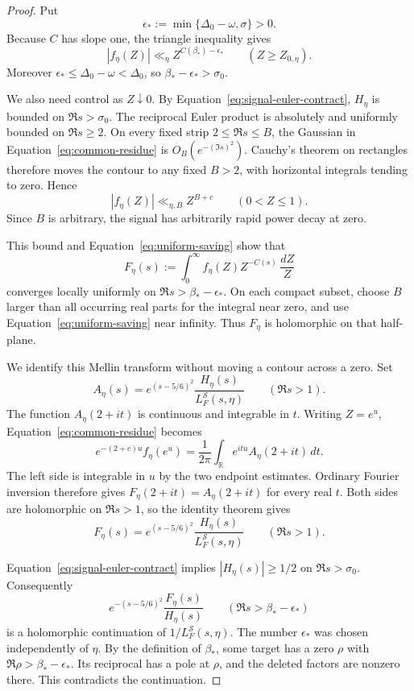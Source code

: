 \documentclass[11pt,a4paper]{article}
\numberwithin{equation}{section}
\numberwithin{figure}{section}
\theoremstyle{definition}
\theoremstyle{remark}
\begin{document}
\begin{proof}
Put
\[
 \epsilon_*:=\min\{\Delta_0-\omega,\sigma\}>0.
\]
Because $C$ has slope one, the triangle inequality gives
\begin{equation}
 |f_\eta(Z)|\ll_\eta Z^{C(\beta_*)-\epsilon_*}
 \qquad (Z\ge Z_{0,\eta}).
 \label{eq:uniform-saving}
\end{equation}
Moreover $\epsilon_*\le\Delta_0-\omega<\Delta_0$, so
$\beta_*-\epsilon_*>\sigma_0$.

We also need control as $Z\downarrow0$. By
Equation~\eqref{eq:signal-euler-contract}, $H_\eta$ is bounded on
$\Re s>\sigma_0$. The reciprocal Euler product is absolutely and uniformly
bounded on $\Re s\ge2$. On every fixed strip $2\le\Re s\le B$, the Gaussian
in Equation~\eqref{eq:common-residue} is $O_B(e^{-(\Im s)^2})$. Cauchy's
theorem on rectangles therefore moves the contour to any fixed $B>2$, with
horizontal integrals tending to zero. Hence
\[
 |f_\eta(Z)|\ll_{\eta,B}Z^{B+c}\qquad(0<Z\le1).
\]
Since $B$ is arbitrary, the signal has arbitrarily rapid power decay at zero.

This bound and Equation~\eqref{eq:uniform-saving} show that
\[
 F_\eta(s):=\int_0^\infty f_\eta(Z)Z^{-C(s)}\,\frac{dZ}{Z}
\]
converges locally uniformly on $\Re s>\beta_*-\epsilon_*$. On each compact
subset, choose $B$ larger than all occurring real parts for the integral near
zero, and use Equation~\eqref{eq:uniform-saving} near infinity. Thus $F_\eta$
is holomorphic on that half-plane.

We identify this Mellin transform without moving a contour across a zero.
Set
\[
 A_\eta(s)=e^{(s-5/6)^2}
             \frac{H_\eta(s)}{L_F^{\mathcal S}(s,\eta)}
 \qquad(\Re s>1).
\]
The function $A_\eta(2+it)$ is continuous and integrable in $t$. Writing
$Z=e^u$, Equation~\eqref{eq:common-residue} becomes
\[
 e^{-(2+c)u}f_\eta(e^u)
   =\frac1{2\pi}\int_{\mathbb R}e^{itu}A_\eta(2+it)\,dt.
\]
The left side is integrable in $u$ by the two endpoint estimates. Ordinary
Fourier inversion therefore gives $F_\eta(2+it)=A_\eta(2+it)$ for every real
$t$. Both sides are holomorphic on $\Re s>1$, so the identity theorem gives
\[
 F_\eta(s)=e^{(s-5/6)^2}
             \frac{H_\eta(s)}{L_F^{\mathcal S}(s,\eta)}
 \qquad(\Re s>1).
\]

Equation~\eqref{eq:signal-euler-contract} implies $|H_\eta(s)|\ge1/2$ on
$\Re s>\sigma_0$. Consequently
\[
 e^{-(s-5/6)^2}\frac{F_\eta(s)}{H_\eta(s)}
 \qquad(\Re s>\beta_*-\epsilon_*)
\]
is a holomorphic continuation of $1/L_F^{\mathcal S}(s,\eta)$.
The number $\epsilon_*$ was chosen independently of $\eta$. By the definition
of $\beta_*$, some target has a zero $\rho$ with
$\Re\rho>\beta_*-\epsilon_*$. Its reciprocal has a pole at $\rho$, and the
deleted factors are nonzero there. This contradicts the continuation.
\end{proof}
\end{document}
